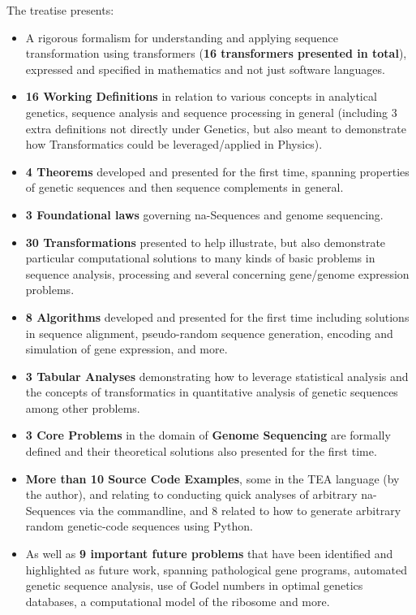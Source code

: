 \documentclass[12pt]{article}
\begin{document}
The treatise presents:
\begin{itemize}
    \item A rigorous formalism for understanding and applying sequence transformation using transformers (\textbf{16 transformers presented in total}), expressed and specified in mathematics and not just software languages.
    \item \textbf{16 Working Definitions} in relation to various concepts in analytical genetics, sequence analysis and sequence processing in general (including 3 extra definitions not directly under Genetics, but also meant to demonstrate how Transformatics could be leveraged/applied in Physics).
    \item \textbf{4 Theorems}  developed and presented for the first time, spanning properties of genetic sequences and then sequence complements in general.
    \item \textbf{3 Foundational laws} governing na-Sequences and genome sequencing.
    \item \textbf{30 Transformations} presented to help illustrate, but also demonstrate particular computational solutions to many kinds of basic problems in sequence analysis, processing and several concerning gene/genome expression problems.
    \item \textbf{8 Algorithms} developed and presented for the first time including solutions in sequence alignment, pseudo-random sequence generation, encoding and simulation of gene expression, and more.
    \item \textbf{3 Tabular Analyses} demonstrating how to leverage statistical analysis and the concepts of transformatics in quantitative analysis of genetic sequences among other problems.
    \item \textbf{3 Core Problems} in the domain of \textbf{Genome Sequencing} are formally defined and their theoretical solutions also presented for the first time.
    \item \textbf{More than 10 Source Code Examples}, some in the TEA language (by the author), and relating to conducting quick analyses of arbitrary na-Sequences via the commandline, and 8 related to how to generate arbitrary random genetic-code sequences using Python.
    \item As well as \textbf{9 important future problems} that have been identified and highlighted as future work, spanning pathological gene programs, automated genetic sequence analysis, use of Godel numbers in optimal genetics databases, a computational model of the ribosome and more.
\end{itemize}
\end{document}
